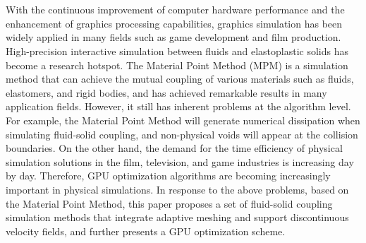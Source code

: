 \newpage
\vspace{-2.5cm}
\chapter*{}

\vspace{-0.5cm}


\setlength{\baselineskip}{17pt}
With the continuous improvement of computer hardware performance and the enhancement of graphics processing capabilities, graphics simulation has been widely applied in many fields such as game development and film production. High-precision interactive simulation between fluids and elastoplastic solids has become a research hotspot. The Material Point Method (MPM) is a simulation method that can achieve the mutual coupling of various materials such as fluids, elastomers, and rigid bodies, and has achieved remarkable results in many application fields. However, it still has inherent problems at the algorithm level. For example, the Material Point Method will generate numerical dissipation when simulating fluid-solid coupling, and non-physical voids will appear at the collision boundaries. On the other hand, the demand for the time efficiency of physical simulation solutions in the film, television, and game industries is increasing day by day. Therefore, GPU optimization algorithms are becoming increasingly important in physical simulations. In response to the above problems, based on the Material Point Method, this paper proposes a set of fluid-solid coupling simulation methods that integrate adaptive meshing and support discontinuous velocity fields, and further presents a GPU optimization scheme.

